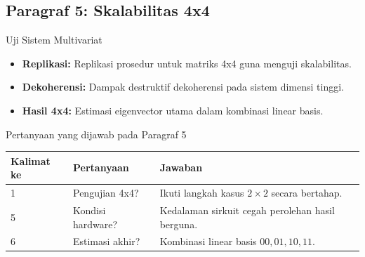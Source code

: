 \subsection{Paragraf 5: Skalabilitas 4x4}
\begin{frame}{Uji Sistem Multivariat}
    \begin{itemize}
        \item \textbf{Replikasi:} Replikasi prosedur untuk matriks 4x4 guna menguji skalabilitas.
        \item \textbf{Dekoherensi:} Dampak destruktif dekoherensi pada sistem dimensi tinggi.
        \item \textbf{Hasil 4x4:} Estimasi eigenvector utama dalam kombinasi linear basis.
    \end{itemize}
\end{frame}

\begin{frame}{Pertanyaan yang dijawab pada Paragraf 5}
    \centering
    \small
    \begin{tabular}{lp{4.5cm}p{6cm}}
        \toprule
        Kalimat ke & Pertanyaan & Jawaban \\
        \midrule
        1 & Pengujian 4x4? & Ikuti langkah kasus $2 \times 2$ secara bertahap. \\
        5 & Kondisi hardware? & Kedalaman sirkuit cegah perolehan hasil berguna. \\
        6 & Estimasi akhir? & Kombinasi linear basis $00, 01, 10, 11$. \\
        \bottomrule
    \end{tabular}
\end{frame}
